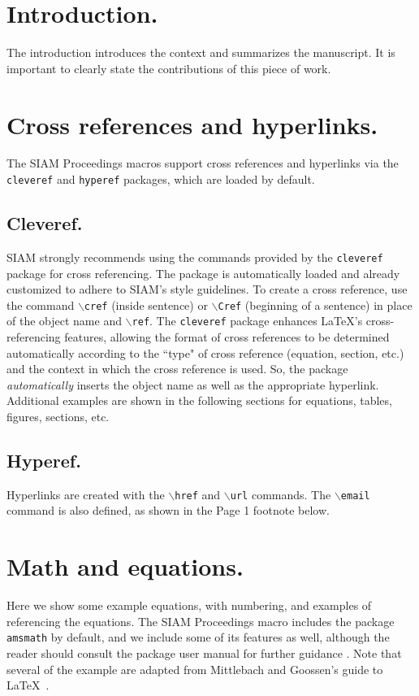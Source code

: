 \documentclass[twoside,leqno,twocolumn]{article}
\begin{document}
\section{Introduction.}
The introduction introduces the context and summarizes the manuscript. It is important to clearly state the contributions of this piece of work.

\section{Cross references and hyperlinks.}
\label{sec:cr+hyp}

The SIAM Proceedings macros support cross references and hyperlinks via the
\texttt{cleveref} and \texttt{hyperef} packages, which are loaded by default.

\subsection{Cleveref.}
\label{sec:cleveref}

SIAM strongly recommends using the commands provided by 
the \texttt{cleveref} package for cross referencing.
The package is automatically loaded and already customized
to adhere to SIAM's style guidelines. 
To create a cross reference, use the command $\backslash$\texttt{cref} (inside
sentence) or $\backslash$\texttt{Cref} (beginning of a sentence) in place of the
object name and $\backslash$\texttt{ref}. 
The \texttt{cleveref} package enhances \LaTeX's cross-referencing features, 
allowing the format of cross references to be determined automatically
according to the ``type" of cross reference (equation, section, etc.)
and the context in which the cross reference is used.
So, the package \emph{automatically} inserts the object name as well as the
appropriate hyperlink.
Additional examples are shown in the following sections for equations, 
tables, figures, sections, etc.

\subsection{Hyperef.}
\label{sec:hyperef}

Hyperlinks are created with the $\backslash$\texttt{href} and $\backslash$\texttt{url} commands.
The $\backslash$\texttt{email} command is also defined, as shown in the
Page 1 footnote below.

\section{Math and equations.}
\label{sec:math}
Here we show some example equations, with numbering, and examples of
referencing the equations. The SIAM Proceedings macro includes the package 
\texttt{amsmath} by default, and we include some of its features as
well, although the reader should consult the package user manual for
further guidance \cite{amsmath,shortmath}.
Note that several of the example are adapted from Mittlebach and Goossen's 
guide to \LaTeX~\cite{MiGo04}.
\end{document}
